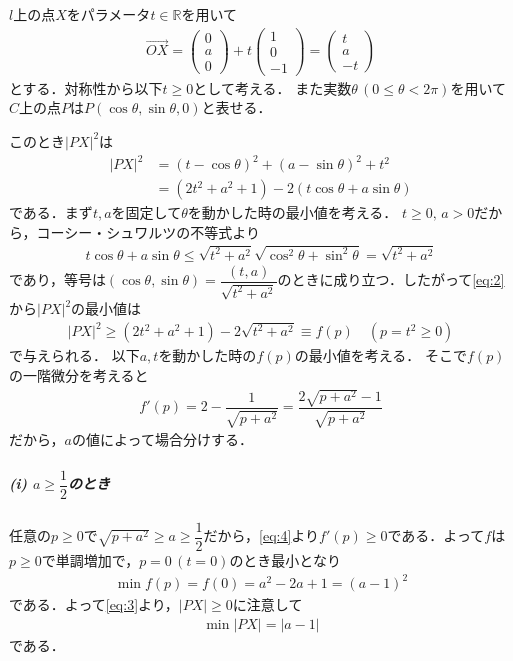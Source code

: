 \documentclass[../../main.tex]{subfiles}
\begin{document}
$l$上の点$X$をパラメータ$t\in\mathbb{R}$を用いて
\begin{align}
  \overrightarrow{OX}
  =
  \begin{pmatrix}0\\a\\0
  \end{pmatrix}+t
  \begin{pmatrix}1\\0\\-1
  \end{pmatrix}
  =
  \begin{pmatrix}t\\a\\-t
  \end{pmatrix}  \label{eq:1}
\end{align}
とする．対称性から以下$t\ge0$として考える．
また実数$\theta\, (0\le\theta<2\pi)$を用いて$C$上の点$P$は$P(\cos\theta,\sin\theta,0)$と表せる．

このとき$|PX|^2$は
\begin{align}
  |PX|^2&=(t-\cos\theta)^2+(a-\sin\theta)^2+t^2 \\
  &=(2t^2+a^2+1)-2(t\cos\theta+a\sin\theta) \label{eq:2}
\end{align}
である．まず$t,a$を固定して$\theta$を動かした時の最小値を考える．
$t\ge0,\,a>0$だから，コーシー・シュワルツの不等式より
\begin{align}
  t\cos\theta+a\sin\theta\le\sqrt{t^2+a^2}\sqrt{\cos^2\theta+\sin^2\theta}=\sqrt{t^2+a^2}
\end{align}
であり，等号は$(\cos\theta,\sin\theta)=\dfrac{(t,a)}{\sqrt{t^2+a^2}}$のときに成り立つ．したがって\cref{eq:2}から$|PX|^2$の最小値は
\begin{align}
  |PX|^2\ge(2t^2+a^2+1)-2\sqrt{t^2+a^2}\equiv f(p) \quad (p=t^2\ge0) \label{eq:3}
\end{align}
で与えられる．
以下$a,t$を動かした時の$f(p)$の最小値を考える．
そこで$f(p)$の一階微分を考えると
\begin{align}
  f'(p)=2-\dfrac{1}{\sqrt{p+a^2}}=\dfrac{2\sqrt{p+a^2}-1}{\sqrt{p+a^2}} \label{eq:4}
\end{align}
だから，$a$の値によって場合分けする．

\subparagraph{(i) $a\ge\dfrac{1}{2}$のとき}

任意の$p\ge0$で$\sqrt{p+a^2}\ge a\ge\dfrac{1}{2}$だから，\cref{eq:4}より$f'(p)\ge0$である．よって$f$は$p\ge0$で単調増加で，$p=0\, (t=0)$のとき最小となり
\begin{align}
  \min f(p)=f(0)=a^2-2a+1=(a-1)^2
\end{align}
である．よって\cref{eq:3}より，$|PX|\ge0$に注意して
\begin{align}
  \min|PX|=|a-1|
\end{align}
である．
\end{document}
